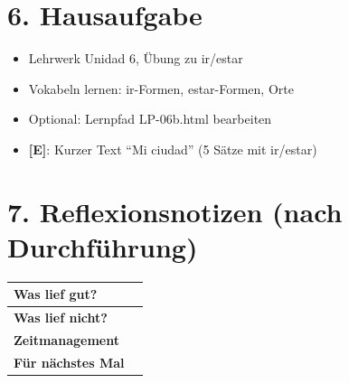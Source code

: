 \documentclass[11pt, a4paper]{article}
\newcommand{\E}{\textcolor{erweiterung}{\textbf{[E]}}}
\begin{document}
\section*{6. Hausaufgabe}

\begin{itemize}
    \item Lehrwerk Unidad 6, Übung zu ir/estar
    \item Vokabeln lernen: ir-Formen, estar-Formen, Orte
    \item Optional: Lernpfad LP-06b.html bearbeiten
    \item \E{}: Kurzer Text ``Mi ciudad'' (5 Sätze mit ir/estar)
\end{itemize}


\section*{7. Reflexionsnotizen (nach Durchführung)}

\begin{tabularx}{\textwidth}{|l|X|}
\hline
\textbf{Was lief gut?} & \\[2em]
\hline
\textbf{Was lief nicht?} & \\[2em]
\hline
\textbf{Zeitmanagement} & \\[2em]
\hline
\textbf{Für nächstes Mal} & \\[2em]
\hline
\end{tabularx}
\end{document}
